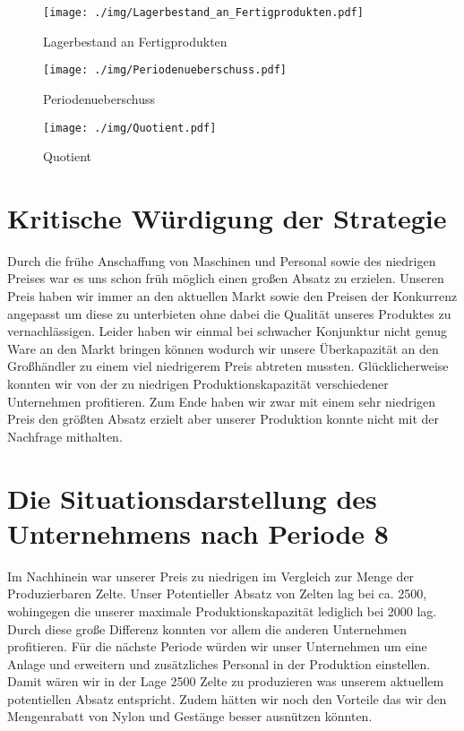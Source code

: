 \documentclass[a4paper, 12pt]{report}
\begin{document}
\begin{flushleft}
 \begin{figure}
 \centering 
 \texttt{[image: ./img/Lagerbestand\_an\_Fertigprodukten.pdf]}
  \caption[Lagerbestand an Fertigprodukten]{Lagerbestand an Fertigprodukten}
\end{figure}

\begin{figure}
 \centering 
 \texttt{[image: ./img/Periodenueberschuss.pdf]}
  \caption[Periodenueberschuss]{Periodenueberschuss}
\end{figure}
 
 \begin{figure}[b]
 \centering 
 \texttt{[image: ./img/Quotient.pdf]}
  \caption[Quotient]{Quotient}
\end{figure}



\chapter{Kritische Würdigung der Strategie}
Durch die frühe Anschaffung von Maschinen und Personal sowie des niedrigen Preises war es uns schon früh möglich einen großen Absatz zu erzielen.
Unseren Preis haben wir immer an den aktuellen Markt sowie den Preisen der Konkurrenz angepasst um diese zu unterbieten ohne dabei die Qualität unseres Produktes zu vernachlässigen.
Leider haben wir einmal bei schwacher Konjunktur nicht genug Ware an den Markt bringen können wodurch wir unsere Überkapazität an den Großhändler zu einem viel niedrigerem Preis abtreten mussten.
Glücklicherweise konnten wir von der zu niedrigen Produktionskapazität verschiedener Unternehmen profitieren.
Zum Ende haben wir zwar mit einem sehr niedrigen Preis den größten Absatz erzielt aber unserer Produktion konnte nicht mit der Nachfrage mithalten.

\chapter{Die Situationsdarstellung des Unternehmens nach Periode 8}  
Im Nachhinein war unserer Preis zu niedrigen im Vergleich zur Menge der Produzierbaren Zelte.
Unser Potentieller Absatz von Zelten lag bei ca. 2500, wohingegen die unserer maximale Produktionskapazität lediglich bei 2000 lag.
Durch diese große Differenz konnten vor allem die anderen Unternehmen profitieren.
Für die nächste Periode würden wir unser Unternehmen um eine Anlage und erweitern und zusätzliches Personal in der Produktion einstellen.
Damit wären wir in der Lage 2500 Zelte zu produzieren was unserem aktuellem potentiellen Absatz entspricht.
Zudem hätten wir noch den Vorteile das wir den Mengenrabatt von Nylon und Gestänge besser ausnützen könnten.


\end{flushleft}
\end{document}
